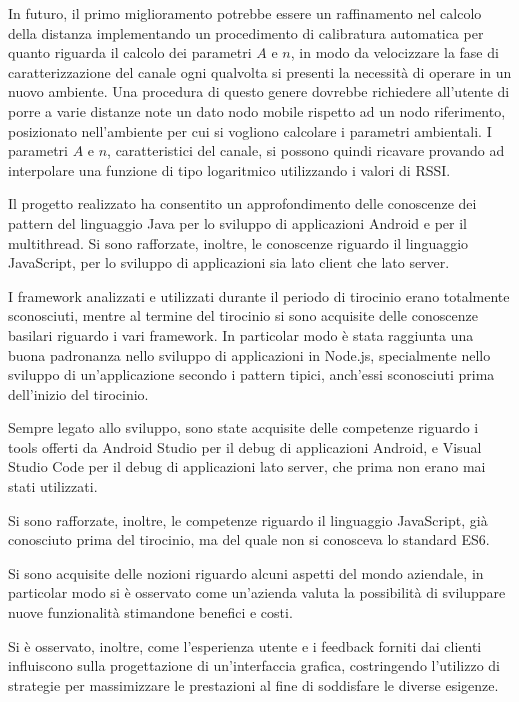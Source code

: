 In futuro, il primo miglioramento potrebbe essere un raffinamento nel calcolo della distanza implementando un procedimento di calibratura automatica per quanto riguarda il calcolo dei parametri $A$ e $n$, in modo da velocizzare la fase di caratterizzazione del canale ogni qualvolta si presenti la necessità di operare in un nuovo ambiente. Una procedura di questo genere dovrebbe richiedere all'utente di porre a varie distanze note un dato nodo mobile rispetto ad un nodo riferimento, posizionato nell'ambiente per cui si vogliono calcolare i parametri ambientali. I parametri $A$ e $n$, caratteristici del canale, si possono quindi ricavare provando ad interpolare una funzione di tipo logaritmico utilizzando i valori di RSSI.

Il progetto realizzato ha consentito un approfondimento delle conoscenze dei pattern del linguaggio Java per lo sviluppo di applicazioni Android e per il multithread. Si sono rafforzate, inoltre, le conoscenze riguardo il linguaggio JavaScript, per lo sviluppo di applicazioni sia lato client che lato server.

I framework analizzati e utilizzati durante il periodo di tirocinio erano totalmente sconosciuti, mentre al termine del tirocinio si sono acquisite delle conoscenze basilari riguardo i vari framework. In particolar modo è stata raggiunta una buona padronanza nello sviluppo di applicazioni in Node.js, specialmente nello sviluppo di un'applicazione secondo i pattern tipici, anch'essi sconosciuti prima dell'inizio del tirocinio.

Sempre legato allo sviluppo, sono state acquisite delle competenze riguardo i tools offerti da Android Studio per il debug di applicazioni Android, e Visual Studio Code per il debug di applicazioni lato server, che prima non erano mai stati utilizzati.

Si sono rafforzate, inoltre, le competenze riguardo il linguaggio JavaScript, già conosciuto prima del tirocinio, ma del quale non si conosceva lo standard ES6.

Si sono acquisite delle nozioni riguardo alcuni aspetti del mondo aziendale, in particolar modo si è osservato come un'azienda valuta la possibilità di sviluppare nuove funzionalità stimandone benefici e costi.

Si è osservato, inoltre, come l'esperienza utente e i feedback forniti dai clienti influiscono sulla progettazione di un'interfaccia grafica, costringendo l'utilizzo di strategie per massimizzare le prestazioni al fine di soddisfare le diverse esigenze.